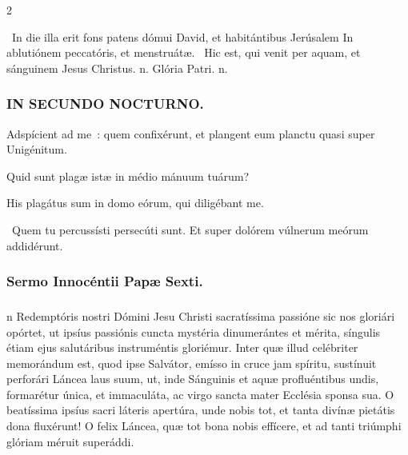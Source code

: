 \documentclass[9pt,twoside]{extarticle}
\begin{document}
\begin{multicols}{2}
\begin{tightlist}{}
\item {}~In die illa erit fons patens dómui David, et habitántibus Jerúsalem \textred{*} In ablutiónem peccatóris, et menstruátæ. ~Hic est, qui venit per aquam, et sánguinem Jesus Christus. n. Glória Patri. n.
\end{tightlist}

\subsubsection*{\center \textsc{IN SECUNDO NOCTURNO.}}
\begin{tightlist}{}
\item {} Adspícient ad me~: quem confixérunt, et plangent eum planctu quasi super Unigénitum.
\item {} Quid sunt plagæ istæ in médio mánuum tuárum?
\item {} His plagátus sum in domo eórum, qui diligébant me.
\item {}~Quem tu percussísti persecúti sunt. Et super dolórem vúlnerum meórum addidérunt.
\end{tightlist}

\subsubsection*{\center Sermo Innocéntii Papæ Sexti.}
\subsubsection*{}
n Redemptóris nostri Dómini Jesu Christi sacratíssima passióne sic nos gloriári opórtet, ut ipsíus passiónis cuncta mystéria dinumerántes et mérita, síngulis étiam ejus salutáribus instruméntis gloriémur. Inter quæ illud celébriter memorándum est, quod ipse Salvátor, emísso in cruce jam spíritu, sustínuit perforári Láncea laus suum, ut, inde Sánguinis et aquæ profluéntibus undis, formarétur única, et immaculáta, ac virgo sancta mater Ecclésia sponsa sua. O beatíssima ipsíus sacri láteris apertúra, unde nobis tot, et tanta divínæ pietátis dona fluxérunt! O felix Láncea, quæ tot bona nobis effícere, et ad tanti triúmphi glóriam méruit superáddi.


\end{multicols}
\end{document}
